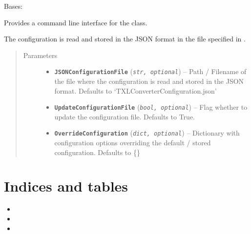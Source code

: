 \documentclass[letterpaper,10pt,english]{sphinxmanual}
\begin{document}
\begin{fulllineitems}
\label{Chapters/PythonModuleReference/TXLConverter/TXLWizard.TXLConverterCLI:TXLWizard.TXLConverterCLI.TXLConverterCLI}
Bases: 

Provides a command line interface for the {\hyperref[Chapters/PythonModuleReference/TXLConverter/TXLWizard.TXLConverter:TXLWizard.TXLConverter.TXLConverter]{}} class.

The configuration is read and stored in the JSON format in the file specified  in .
\begin{quote}\begin{description}
\item[{Parameters}] \leavevmode\begin{itemize}
\item {} 
\textbf{\texttt{JSONConfigurationFile}} (\emph{\texttt{str, optional}}) -- Path / Filename of the file where the configuration is read and stored in the JSON format.
Defaults to `TXLConverterConfiguration.json'

\item {} 
\textbf{\texttt{UpdateConfigurationFile}} (\emph{\texttt{bool, optional}}) -- Flag whether to update the configuration file.
Defaults to True.

\item {} 
\textbf{\texttt{OverrideConfiguration}} (\emph{\texttt{dict, optional}}) -- Dictionary with configuration options overriding the default / stored configuration.
Defaults to \{\}

\end{itemize}

\end{description}\end{quote}

\end{fulllineitems}



\chapter{Indices and tables}
\label{index:indices-and-tables}\begin{itemize}
\item {} 

\item {} 

\item {} 

\end{itemize}
\end{document}
